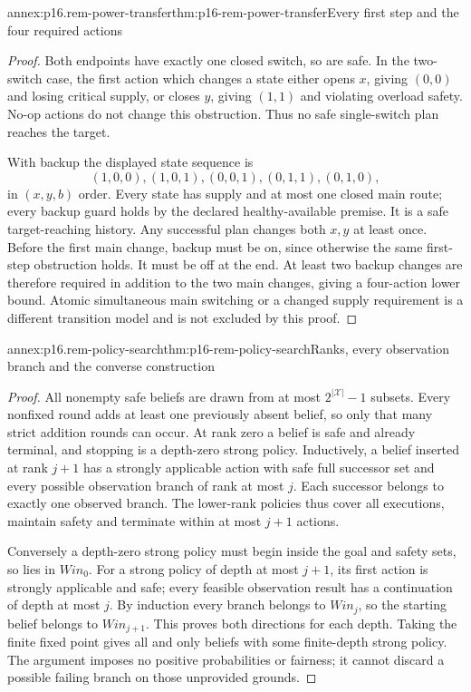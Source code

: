\begin{annexitem}{annex:p16.rem-power-transfer}{thm:p16-rem-power-transfer}{Every first step and the four required actions}
\begin{proof}
Both endpoints have exactly one closed switch, so are safe. In the two-
switch case, the first action which changes a state either opens \(x\),
giving \((0,0)\) and losing critical supply, or closes \(y\), giving
\((1,1)\) and violating overload safety. No-op actions do not change
this obstruction. Thus no safe single-switch plan reaches the target.

With backup the displayed state sequence is
\[
 (1,0,0),(1,0,1),(0,0,1),(0,1,1),(0,1,0),
\]
in \((x,y,b)\) order. Every state has supply and at most one closed main route; every
backup guard holds by the declared healthy-available premise. It is a
safe target-reaching history. Any successful plan changes both \(x,y\)
at least once. Before the first main change, backup must be on, since
otherwise the same first-step obstruction holds. It must be off at the
end. At least two backup changes are therefore required in addition to
the two main changes, giving a four-action lower bound. Atomic simultaneous
main switching or a changed supply requirement is a different transition
model and is not excluded by this proof.
\end{proof}
\end{annexitem}

\begin{annexitem}{annex:p16.rem-policy-search}{thm:p16-rem-policy-search}{Ranks, every observation branch and the converse construction}
\begin{proof}
All nonempty safe beliefs are drawn from at most \(2^{|\mathcal X|}-1\)
subsets. Every nonfixed round adds at least one previously absent belief,
so only that many strict addition rounds can occur. At rank zero a belief
is safe and already terminal, and stopping is a depth-zero strong policy.
Inductively, a belief inserted at rank \(j+1\) has a strongly applicable
action with safe full successor set and every possible observation branch
of rank at most \(j\). Each successor belongs to exactly one observed
branch. The lower-rank policies thus cover all executions, maintain safety
and terminate within at most \(j+1\) actions.

Conversely a depth-zero strong policy must begin inside the goal and safety
sets, so lies in \(Win_0\). For a strong policy of depth at most \(j+1\),
its first action is strongly applicable and safe; every feasible observation
result has a continuation of depth at most \(j\). By induction every
branch belongs to \(Win_j\), so the starting belief belongs to
\(Win_{j+1}\). This proves both directions for each depth. Taking the
finite fixed point gives all and only beliefs with some finite-depth
strong policy. The argument imposes no positive probabilities or fairness;
it cannot discard a possible failing branch on those unprovided grounds.
\end{proof}
\end{annexitem}

